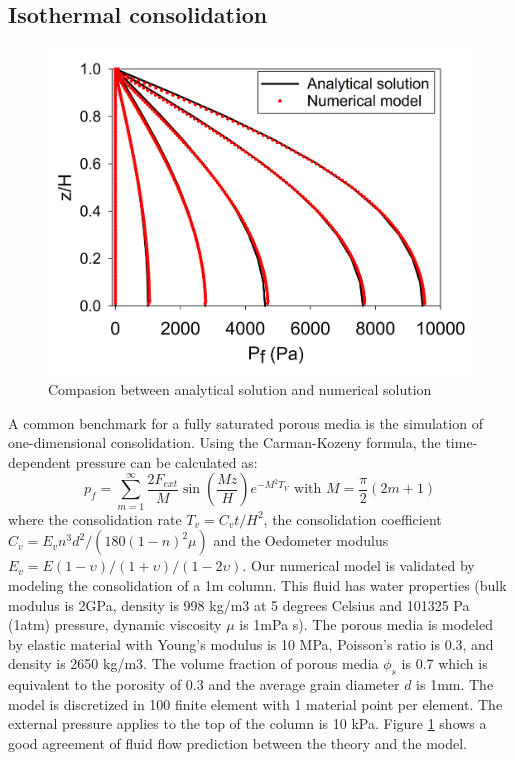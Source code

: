 \documentclass[preprint,12pt]{elsarticle}
\begin{document}
\subsection{\textsf{Isothermal consolidation}}
%
%
\begin{figure}[h]
\center
\includegraphics[scale=.3]{consolidation.jpg}
\caption{Compasion between analytical solution and numerical solution}
\label{fig:consolidation}
\end {figure}
%
%
A common benchmark for a fully saturated porous media is the simulation of one-dimensional consolidation. Using the Carman-Kozeny formula, the time-dependent pressure can be calculated as:
%
%
\begin{equation}
  p_f  = \sum_{m=1}^{\infty} \frac{2F_{ext}}{M} \sin (\frac{Mz}{H}) e^{-M^2T_V} \textrm{    with    }   M = \frac{\pi}{2} (2m+1)
\end {equation}
%
%
where the consolidation rate $T_v =C_vt/H^2$, the consolidation coefficient $C_v = E_v n^3 d^2/(180(1-n)^2\mu) $ and the Oedometer modulus $E_v = E(1-\upsilon)/(1+\upsilon)/(1-2\upsilon)$.
Our numerical model is validated by modeling the consolidation of a 1m column. This fluid has water properties (bulk modulus is 2GPa, density is 998 kg/m3 at 5 degrees Celsius and 101325 Pa (1atm) pressure, dynamic viscosity $\mu$ is 1mPa s). The porous media is modeled by elastic material with Young's modulus is 10 MPa, Poisson's ratio is 0.3, and density is 2650 kg/m3. The volume fraction of porous media $\phi_s$ is 0.7 which is equivalent to the porosity of 0.3 and the average grain diameter $d$ is 1mm. The model is discretized in 100 finite element with 1 material point per element. The external pressure applies to the top of the column is 10 kPa. Figure \ref{fig:consolidation} shows a good agreement of fluid flow prediction between the theory and the model. \\
\end{document}
